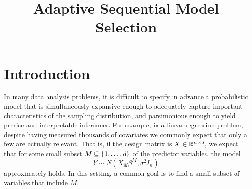 \documentclass{article}
\begin{document}
\newtheorem{theorem}{Theorem}
\newtheorem{corollary}[theorem]{Corollary}
\newtheorem{lemma}[theorem]{Lemma}
\newtheorem{observation}[theorem]{Observation}
\newtheorem{proposition}[theorem]{Proposition}
\newtheorem{definition}[theorem]{Definition}
\newtheorem{claim}[theorem]{Claim}
\newtheorem{fact}[theorem]{Fact}
\newtheorem{assumption}[theorem]{Assumption}
\newtheorem{model}[theorem]{Model}

\theoremstyle{definition}
\newtheorem{example}{Example}

\newcommand{\cM}{\mathcal{M}}
\newcommand{\cH}{\mathcal{H}}
\newcommand{\cD}{\mathcal{D}}
\newcommand{\FDR}{\textnormal{FDR}}
\newcommand{\FCR}{\textnormal{FCR}}
\newcommand{\crt}{\phi}
\newcommand{\M}{\mathcal{M}}
\newcommand{\cY}{\mathcal{Y}}
\newcommand{\cX}{\mathcal{X}}
\newcommand{\cV}{\mathcal{V}}
\newcommand{\bX}{\mathbf{X}}
\newcommand{\x}{\mathbf{x}}
\newcommand{\Gv}{\;\;\big|\;\;}
\newcommand{\proj}{\cP}
\newcommand{\pow}{\text{Pow}}
\newcommand{\sF}{\mathscr{F}}
\newcommand{\cF}{\mathcal{F}}
\newcommand{\sC}{\mathscr{C}}
\newcommand{\hJ}{\widehat{J}}
\newcommand{\bH}{\mathbf{H}}
\newcommand{\bM}{\mathbf{M}}
\newcommand{\hK}{\widehat{K}}
\newcommand{\leqAS}{\overset{\textrm{a.s.}}{\leq}}
\newcommand{\cN}{\mathcal{N}}

\newcommand*\mystrut{\vrule width0pt height0pt depth1.5ex\relax}
\newcommand{\underlabel}{\underbracket[1pt][.5pt]{\mystrut \quad\;\; \sub \quad\;\; }}
\newcommand{\JTcomment}[1]{{\color{blue}{(JT: \bf \sc #1) }}}
\newcommand{\WFcomment}[1]{{\color{red}{(WF: \bf \sc #1) }}}

\title{Adaptive Sequential Model Selection}
\maketitle

\begin{abstract}
  
\end{abstract}



\section{Introduction}

In many data analysis problems, it is difficult to specify in advance a probabilistic model that is simultaneously expansive enough to adequately capture important characteristics of the sampling distribution, and parsimonious enough to yield precise and interpretable inferences. For example, in a linear regression problem, despite having measured thousands of covariates we commonly expect that only a few are actually relevant. That is, if the design matrix is $X\in \mathbb{R}^{n\times d}$, we expect that for some small subset $M\subseteq \{1,\ldots,d\}$ of the predictor variables, the model
\begin{equation}
  Y \sim N(X_M\beta^M, \sigma^2I_n)
\end{equation}
approximately holds. In this setting, a common goal is to find a small subset of variables that include $M$.
\end{document}
